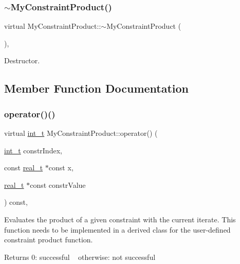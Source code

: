 \subsubsection{\texorpdfstring{$\sim$\+My\+Constraint\+Product()}{~MyConstraintProduct()}}
{\footnotesize\ttfamily virtual My\+Constraint\+Product\+::$\sim$\+My\+Constraint\+Product (\begin{DoxyParamCaption}{ }\end{DoxyParamCaption})\hspace{0.3cm}{\ttfamily [inline]}, {\ttfamily [virtual]}}

Destructor. 

\subsection{Member Function Documentation}
\mbox{\label{class_my_constraint_product_a6ba41714619bb87b76597503373c2c39}} 
\subsubsection{\texorpdfstring{operator()()}{operator()()}}
{\footnotesize\ttfamily virtual \hyperlink{_types_8hpp_ab6fd6105e64ed14a0c9281326f05e623}{int\+\_\+t} My\+Constraint\+Product\+::operator() (\begin{DoxyParamCaption}\item[{\hyperlink{_types_8hpp_ab6fd6105e64ed14a0c9281326f05e623}{int\+\_\+t}}]{constr\+Index,  }\item[{const \hyperlink{qp_o_a_s_e_s__wrapper_8h_a0d00e2b3dfadee81331bbb39068570c4}{real\+\_\+t} $\ast$const}]{x,  }\item[{\hyperlink{qp_o_a_s_e_s__wrapper_8h_a0d00e2b3dfadee81331bbb39068570c4}{real\+\_\+t} $\ast$const}]{constr\+Value }\end{DoxyParamCaption}) const\hspace{0.3cm}{\ttfamily [inline]}, {\ttfamily [virtual]}}

Evaluates the product of a given constraint with the current iterate. This function needs to be implemented in a derived class for the user-\/defined constraint product function. \begin{DoxyReturn}{Returns}
0\+: successful ~\newline
 otherwise\+: not successful 
\end{DoxyReturn}



